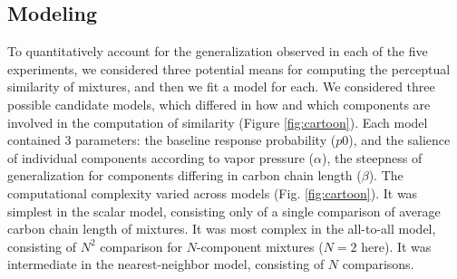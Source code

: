 \subsection*{Modeling}
\label{sec:results_modeling}
To quantitatively account for the generalization observed in each of the five experiments, we considered three potential means for computing the perceptual similarity of mixtures, and then we fit a model for each.  
We considered three possible candidate models, which differed in how and which components are involved in the computation of similarity (Figure \ref{fig:cartoon}).  
Each model contained 3 parameters: the baseline response probability ($p0$), and the salience of individual components according to vapor pressure ($\alpha$), the steepness of generalization for components differing in carbon chain length ($\beta$).  
The computational complexity varied across models (Fig. \ref{fig:cartoon}).  It was simplest in the scalar model, consisting only of a single comparison of average carbon chain length of mixtures.  It was most complex in the all-to-all model, consisting of $N^2$ comparison for $N$-component mixtures ($N=2$ here).  It was intermediate in the nearest-neighbor model, consisting of $N$ comparisons.  